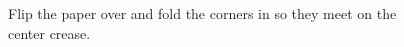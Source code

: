 \documentclass[12pt]{article}
\begin{document}
\begin{figure}[!h]
  \centering
  \caption{Flip the paper over and fold the corners in so they meet on the center crease.}
  \qquad
\end{figure}
\clearpage
\end{document}
